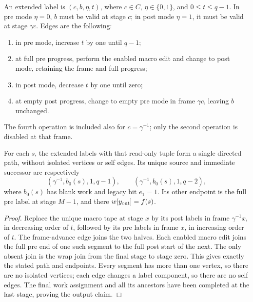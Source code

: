 \begin{definition}\label{ia:extended-path}
An extended label is $(c,b,\eta,t)$, where $c\in C$,
$\eta\in\{0,1\}$, and $0\le t\le q-1$.  In pre mode $\eta=0$,
$b$ must be valid at stage $c$; in post mode $\eta=1$, it must be valid
at stage $\gamma c$.  Edges are the following:
\begin{enumerate}
\item in pre mode, increase $t$ by one until $q-1$;
\item at full pre progress, perform the enabled macro edit and change
to post mode, retaining the frame and full progress;
\item in post mode, decrease $t$ by one until zero;
\item at empty post progress, change to empty pre mode in frame
$\gamma c$, leaving $b$ unchanged.
\end{enumerate}
The fourth operation is included also for $c=\gamma^{-1}$; only the
second operation is disabled at that frame.
\end{definition}

\begin{lemma}\label{ia:path-endpoints}
For each $s$, the extended labels with that read-only tuple form a
single directed path, without isolated vertices or self edges.  Its
unique source and immediate successor are respectively
\begin{equation}
 (\gamma^{-1},b_0(s),1,q-1),\qquad
 (\gamma^{-1},b_0(s),1,q-2),                      \label{ia:source-successor}
\end{equation}
where $b_0(s)$ has blank work and legacy bit $e_1=1$.  Its other
endpoint is the full pre label at stage $M-1$, and there
$w[y_{\rm out}]=f(s)$.
\end{lemma}

\begin{proof}
Replace the unique macro tape at stage $x$ by its post labels in frame
$\gamma^{-1}x$, in decreasing order of $t$, followed by its pre labels
in frame $x$, in increasing order of $t$.  The frame-advance edge joins
the two halves.  Each enabled macro edit joins the full pre end of one
such segment to the full post start of the next.  The only absent join
is the wrap join from the final stage to stage zero.  This gives exactly
the stated path and endpoints.  Every segment has more than one vertex,
so there are no isolated vertices; each edge changes a label component,
so there are no self edges.  The final work assignment and all its
ancestors have been completed at the last stage, proving the output
claim.
\end{proof}

